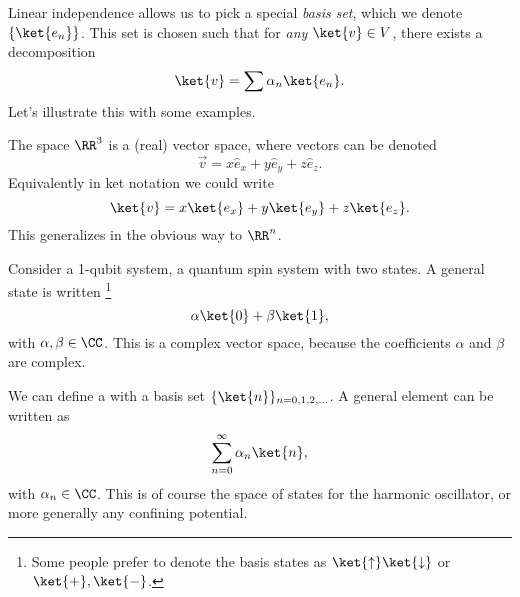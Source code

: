 Linear independence allows us to pick a special \emph{basis set}, which we denote $\set{\ket{e_n}}$. This set is chosen such that for \emph{any} $\ket{v}\in V$, there exists a decomposition
\begin{equation}
    \ket{v} =\sum \alpha_n \ket{e_n}.
\end{equation}
Let's illustrate this with some examples.

\begin{exm}
    The space $\RR^3$ is a (real) vector space, where vectors can be denoted
    \begin{equation}
        \vec{v}= x \hat e_x + y \hat e_y + z \hat e_z.
    \end{equation}
    Equivalently in ket notation we could write
    \begin{equation}
        \ket{v}= x \ket{e_x} + y \ket{e_y} + z \ket{e_z}.
    \end{equation}
    This generalizes in the obvious way to $\RR^n$.
\end{exm}
\begin{exm}
    Consider a 1-qubit system, a quantum spin system with two states. A general state is written%
        \footnote{Some people prefer to denote the basis states as $\ket{\uparrow}\ket{\downarrow}$ or $\ket{+},\ket{-}$.}
    \begin{equation}
        \alpha\ket{0} +\beta\ket{1},
    \end{equation}
    with $\alpha,\beta\in \CC$.
    This is a complex vector space, because the coefficients $\alpha$ and $\beta$ are complex.
\end{exm}
\begin{exm}
    We can define a  with a basis set $\set{\ket{n}}_{n=0,1,2,\dots}$. A general element can be written as
    \begin{equation}
        \sum_{n=0}^\infty \alpha_n \ket{n},
    \end{equation}
    with $\alpha_n\in \CC$. This is of course the space of states for the harmonic oscillator, or more generally any confining potential.
\end{exm}
